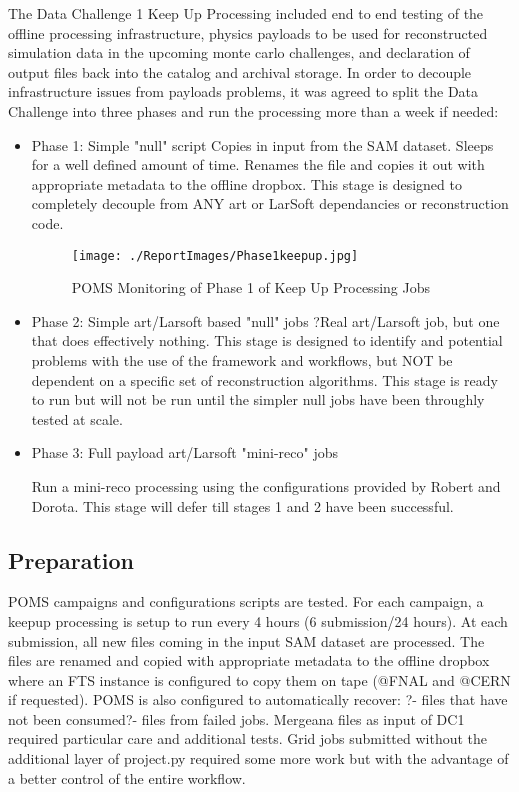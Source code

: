 \documentclass[pdftex,12pt,letter]{article}
\begin{document}
The Data Challenge 1 Keep Up Processing  included end to end testing of the offline processing infrastructure, physics payloads to be used for reconstructed simulation data in the upcoming monte carlo challenges, and declaration of output files back into the catalog and archival storage.  In order to decouple infrastructure issues from  payloads problems, it was agreed to split the Data Challenge into three phases and run the processing more than a week if needed:
\begin {itemize}

\item Phase 1: Simple "null" script
 Copies in input from the SAM dataset.  Sleeps for a well defined amount of time.  Renames the file and copies it out with appropriate metadata to the offline dropbox.
This stage is designed to completely decouple from ANY art or LarSoft dependancies or reconstruction code. 



\begin{figure}[tbh]
  \centering
  \texttt{[image: ./ReportImages/Phase1keepup.jpg]}
  \caption{POMS Monitoring of Phase 1 of Keep Up Processing Jobs}
  \label{fig:keepupprocessingphase1}
\end{figure}


\item Phase 2: Simple art/Larsoft based "null" jobs
 ?Real art/Larsoft job, but one that does effectively nothing.  This stage is designed to identify and potential problems with the use of the framework and workflows, but NOT be dependent on a specific set of reconstruction algorithms.  
 This stage is ready to run but will not be run until the simpler null jobs have been throughly tested at scale.


\item Phase 3: Full payload art/Larsoft "mini-reco" jobs

 Run  a mini-reco processing using the configurations provided by Robert and Dorota. This stage will defer till stages 1 and 2 have been successful.

\end{itemize}

\subsection {Preparation}

POMS campaigns and configurations scripts are tested.
For each campaign, a keepup processing is setup to run every 4 hours (6 submission/24 hours).
At each submission, all new files coming in the input SAM dataset are processed.
The files are renamed and copied with appropriate metadata to the offline dropbox where an FTS instance is configured to copy them on tape (@FNAL and @CERN if requested).
POMS is also configured to automatically  recover:  ?- files that have not been consumed?- files from failed jobs.
Mergeana files as input of DC1 required particular care and additional tests.
Grid jobs submitted  without the additional layer of project.py required some more work but with the advantage of a better control of the entire workflow.
\end{document}
